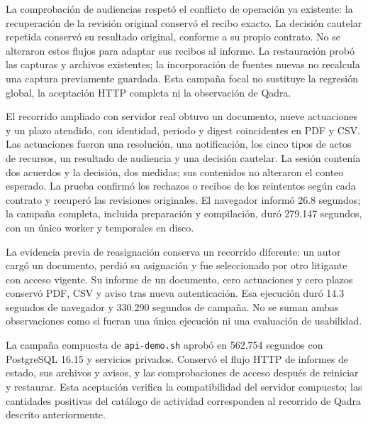 La comprobación de audiencias respetó el conflicto de operación ya existente:
la recuperación de la revisión original conservó el recibo exacto. La decisión
cautelar repetida conservó su resultado original, conforme a su propio contrato.
No se alteraron estos flujos para adaptar sus recibos al informe. La restauración
probó las capturas y archivos existentes; la incorporación de fuentes nuevas no
recalcula una captura previamente guardada. Esta campaña focal no sustituye la
regresión global, la aceptación HTTP completa ni la observación de Qadra.

El recorrido ampliado con servidor real obtuvo un documento, nueve actuaciones
y un plazo atendido, con identidad, periodo y digest coincidentes en PDF y CSV.
Las actuaciones fueron una resolución, una notificación, los cinco tipos de
actos de recursos, un resultado de audiencia y una decisión cautelar. La sesión
contenía dos acuerdos y la decisión, dos medidas; sus contenidos no alteraron
el conteo esperado. La prueba confirmó los rechazos o recibos de los reintentos
según cada contrato y recuperó las revisiones originales. El navegador informó
26.8 segundos; la campaña completa, incluida preparación y compilación, duró
279.147 segundos, con un único worker y temporales en disco.

La evidencia previa de reasignación conserva un recorrido diferente: un autor
cargó un documento, perdió su asignación y fue seleccionado por otro litigante
con acceso vigente. Su informe de un documento, cero actuaciones y cero plazos
conservó PDF, CSV y aviso tras nueva autenticación. Esa ejecución duró
14.3 segundos de navegador y 330.290 segundos de campaña. No se suman ambas
observaciones como si fueran una única ejecución ni una evaluación de usabilidad.

La campaña compuesta de \texttt{api-demo.sh} aprobó en 562.754 segundos con
PostgreSQL 16.15 y servicios privados. Conservó el flujo HTTP de informes de
estado, sus archivos y avisos, y las comprobaciones de acceso después de
reiniciar y restaurar. Esta aceptación verifica la compatibilidad del servidor
compuesto; las cantidades positivas del catálogo de actividad corresponden al
recorrido de Qadra descrito anteriormente.
